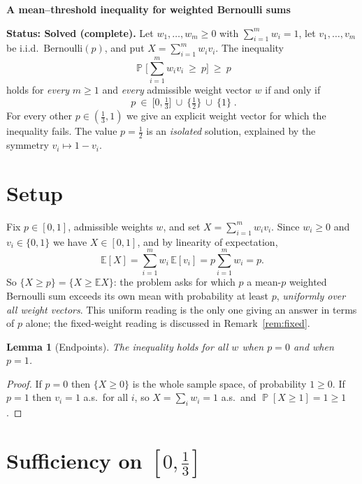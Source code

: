 \documentclass[11pt]{article}
\newtheorem{lemma}{Lemma}
\theoremstyle{definition}
\DeclareMathOperator{\PP}{\mathbb{P}}
\newcommand{\E}{\mathbb{E}}
\begin{document}
\begin{center}
{\Large\bf A mean--threshold inequality for weighted Bernoulli sums}
\end{center}

\medskip

\noindent\textbf{Status: Solved (complete).}
Let $w_1,\dots,w_m\ge 0$ with $\sum_{i=1}^m w_i=1$, let $v_1,\dots,v_m$ be
i.i.d.\ $\mathrm{Bernoulli}(p)$, and put $X=\sum_{i=1}^m w_i v_i$. The
inequality
\[
\PP\Big[\textstyle\sum_{i=1}^m w_i v_i\ \ge\ p\Big]\ \ge\ p
\]
holds for \emph{every} $m\ge 1$ and \emph{every} admissible weight vector $w$ if
and only if
\[
\boxed{\;p\ \in\ \Big[0,\tfrac13\Big]\ \cup\ \Big\{\tfrac12\Big\}\ \cup\ \{1\}\;.}
\]
For every other $p\in(\tfrac13,1)$ we give an explicit weight vector for which
the inequality fails. The value $p=\tfrac12$ is an \emph{isolated} solution,
explained by the symmetry $v_i\mapsto 1-v_i$.

\bigskip

\section{Setup}

Fix $p\in[0,1]$, admissible weights $w$, and set $X=\sum_{i=1}^m w_i v_i$. Since
$w_i\ge0$ and $v_i\in\{0,1\}$ we have $X\in[0,1]$, and by linearity of
expectation,
\begin{equation}\label{eq:mean}
\E[X]=\sum_{i=1}^m w_i\,\E[v_i]=p\sum_{i=1}^m w_i=p.
\end{equation}
So $\{X\ge p\}=\{X\ge\E X\}$: the problem asks for which $p$ a mean-$p$ weighted
Bernoulli sum exceeds its own mean with probability at least $p$, \emph{uniformly
over all weight vectors}. This uniform reading is the only one giving an answer
in terms of $p$ alone; the fixed-weight reading is discussed in
Remark~\ref{rem:fixed}.

\begin{lemma}[Endpoints]\label{lem:endpoints}
The inequality holds for all $w$ when $p=0$ and when $p=1$.
\end{lemma}

\begin{proof}
If $p=0$ then $\{X\ge 0\}$ is the whole sample space, of probability $1\ge0$. If
$p=1$ then $v_i=1$ a.s.\ for all $i$, so $X=\sum_i w_i=1$ a.s.\ and
$\PP[X\ge1]=1\ge1$.
\end{proof}

\section{Sufficiency on \texorpdfstring{$[0,\tfrac13]$}{[0,1/3]}}
\end{document}

